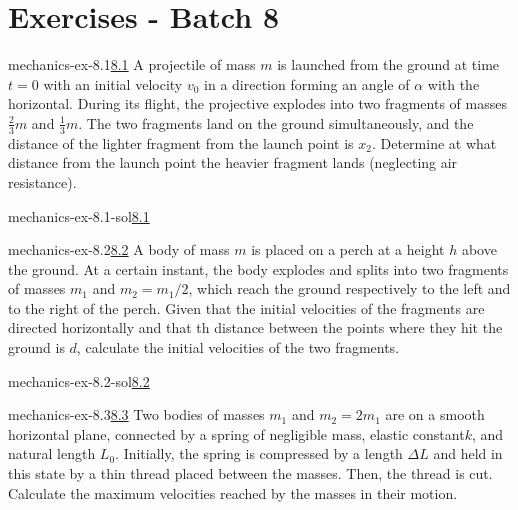 \documentclass[preview]{standalone}
\begin{document}
\genpage

\section{Exercises - Batch 8}

\begin{snippetexercise}{mechanics-ex-8.1}{\underline{8.1}}
    A projectile of mass \(m\) is launched from the ground at time \(t=0\)
    with an initial velocity \(v_0\) in a direction forming an angle of \(\alpha\)
    with the horizontal.
    During its flight, the projective explodes into two fragments of masses
    \(\frac{2}{3}m\) and \(\frac{1}{3}m\). The two fragments
    land on the ground simultaneously, and the distance of the lighter fragment from the launch point is
    \(x_2\). Determine at what distance from the launch point the heavier fragment lands (neglecting air resistance).
\end{snippetexercise}

\begin{snippetsolution}{mechanics-ex-8.1-sol}{\underline{8.1}}
    \todo
\end{snippetsolution}

\begin{snippetexercise}{mechanics-ex-8.2}{\underline{8.2}}
    A body of mass \(m\) is placed on a perch at a height \(h\) above the ground.
    At a certain instant, the body explodes and splits into two fragments of masses \(m_1\) and \(m_2 = m_1 / 2\),
    which reach the ground respectively to the left and to the right of the perch.
    Given that the initial velocities of the fragments are directed horizontally and that th
    distance between the points where they hit the ground is \(d\), calculate the initial velocities of
    the two fragments.
\end{snippetexercise}

\begin{snippetsolution}{mechanics-ex-8.2-sol}{\underline{8.2}}
    \todo
\end{snippetsolution}

\begin{snippetexercise}{mechanics-ex-8.3}{\underline{8.3}}
    Two bodies of masses \(m_1\) and \(m_2 = 2m_1\) are on a smooth horizontal plane,
    connected by a spring of negligible mass, elastic constant\(k\), and natural length \(L_0\).
    Initially, the spring is compressed by a length \(\Delta L\) and held in this state by a thin thread
    placed between the masses. Then, the thread is cut.
    Calculate the maximum velocities reached by the masses in their motion.
\end{snippetexercise}
\end{document}
